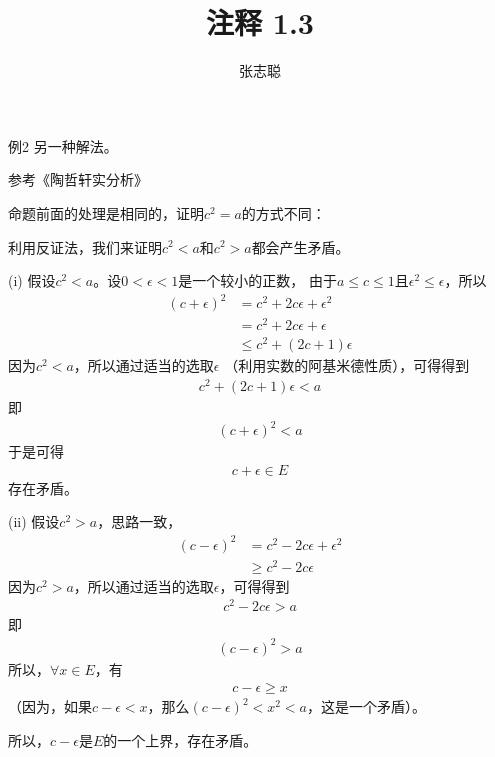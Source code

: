 \documentclass{article}
\begin{document}
\title{注释 1.3}
\author{张志聪}
\maketitle

\begin{zremark}
  例2 另一种解法。
\end{zremark}

参考《陶哲轩实分析》

命题前面的处理是相同的，证明$c^2 = a$的方式不同：

利用反证法，我们来证明$c^2 < a$和$c^2 > a$都会产生矛盾。

(i) 假设$c^2 < a$。设$0 < \epsilon < 1$是一个较小的正数，
由于$a \leq c \leq 1$且$\epsilon^2 \leq \epsilon$，所以
\begin{align*}
  (c + \epsilon)^2 & = c^2 + 2c\epsilon + \epsilon^2 \\
                   & = c^2 + 2c\epsilon + \epsilon   \\
                   & \leq c^2 + (2c + 1) \epsilon
\end{align*}
因为$c^2 < a$，所以通过适当的选取$\epsilon$
（利用实数的阿基米德性质），可得得到
\begin{align*}
  c^2 + (2c + 1) \epsilon < a
\end{align*}
即
\begin{align*}
  (c + \epsilon)^2 < a
\end{align*}
于是可得
\begin{align*}
  c + \epsilon \in E
\end{align*}
存在矛盾。

(ii) 假设$c^2 > a$，思路一致，
\begin{align*}
  (c - \epsilon)^2 & = c^2 - 2c\epsilon + \epsilon^2  \\
                   & \geq c^2 - 2c\epsilon 
\end{align*}
因为$c^2 > a$，所以通过适当的选取$\epsilon$，可得得到
\begin{align*}
  c^2 - 2c\epsilon > a
\end{align*}
即
\begin{align*}
  (c - \epsilon)^2 > a 
\end{align*}
所以，$\forall x \in E$，有
\begin{align*}
  c - \epsilon \geq x
\end{align*}
（因为，如果$c - \epsilon < x$，那么$(c - \epsilon)^2 < x^2 <a$，这是一个矛盾）。

所以，$c - \epsilon$是$E$的一个上界，存在矛盾。
\end{document}
